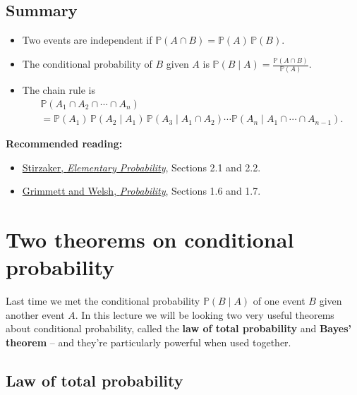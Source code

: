 \documentclass[
  a4paper,
]{book}
\providecommand{\tightlist}{%
  \setlength{\itemsep}{0pt}\setlength{\parskip}{0pt}}
\theoremstyle{definition}
\theoremstyle{definition}
\theoremstyle{definition}
\theoremstyle{definition}
\theoremstyle{remark}
\begin{document}
\hypertarget{summary-L07}{%
\section*{Summary}\label{summary-L07}}

\begin{itemize}
\tightlist
\item
  Two events are independent if \(\mathbb P(A \cap B) = \mathbb P(A)\, \mathbb P(B)\).
\item
  The conditional probability of \(B\) given \(A\) is \({\displaystyle \mathbb P(B \mid A) = \frac{\mathbb P(A \cap B)}{\mathbb P(A)}}\).
\item
  The chain rule is
  \begin{multline*}
  \mathbb P(A_1 \cap A_2 \cap \cdots \cap A_n) \\
  = \mathbb P(A_1) \, \mathbb P(A_2 \mid A_1) \, \mathbb P(A_3 \mid A_1 \cap A_2) \cdots \mathbb P(A_n \mid A_1 \cap \cdots \cap  A_{n-1}) . 
  \end{multline*}
\end{itemize}

\textbf{Recommended reading:}

\begin{itemize}
\tightlist
\item
  \href{https://leeds.primo.exlibrisgroup.com/permalink/44LEE_INST/13rlbcs/alma991013131349705181}{Stirzaker, \emph{Elementary Probability}}, Sections 2.1 and 2.2.
\item
  \href{https://leeds.primo.exlibrisgroup.com/permalink/44LEE_INST/13rlbcs/alma991002938669705181}{Grimmett and Welsh, \emph{Probability}}, Sections 1.6 and 1.7.
\end{itemize}

\hypertarget{L08-two-theorems}{%
\chapter{Two theorems on conditional probability}\label{L08-two-theorems}}

Last time we met the conditional probability \(\mathbb P(B \mid A)\) of one event \(B\) given another event \(A\). In this lecture we will be looking two very useful theorems about conditional probability, called the \textbf{law of total probability} and \textbf{Bayes' theorem} -- and they're particularly powerful when used together.

\hypertarget{total-prob}{%
\section{Law of total probability}\label{total-prob}}
\end{document}
